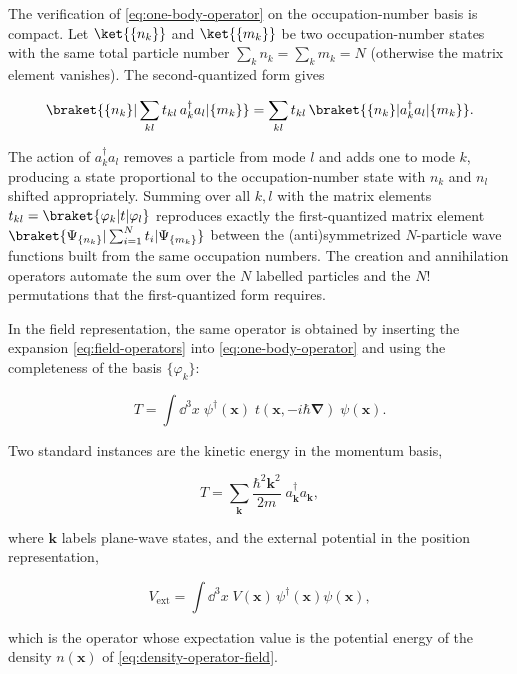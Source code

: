 \begin{note}
    The verification of \eqref{eq:one-body-operator} on the occupation-number basis is compact. Let $\ket{\{n_k\}}$ and $\ket{\{m_k\}}$ be two occupation-number states with the same total particle number $\sum_k n_k = \sum_k m_k = N$ (otherwise the matrix element vanishes). The second-quantized form gives
    \begin{linenomath}
        \begin{equation*}
            \braket{\{n_k\}|\sum_{kl} t_{kl}\,a_k^\dagger a_l|\{m_k\}}
            = \sum_{kl} t_{kl}\,\braket{\{n_k\}|a_k^\dagger a_l|\{m_k\}}.
        \end{equation*}
    \end{linenomath}
    The action of $a_k^\dagger a_l$ removes a particle from mode $l$ and adds one to mode $k$, producing a state proportional to the occupation-number state with $n_k$ and $n_l$ shifted appropriately. Summing over all $k,l$ with the matrix elements $t_{kl} = \braket{\varphi_k|t|\varphi_l}$ reproduces exactly the first-quantized matrix element $\braket{\Psi_{\{n_k\}}|\sum_{i=1}^N t_i|\Psi_{\{m_k\}}}$ between the (anti)symmetrized $N$-particle wave functions built from the same occupation numbers. The creation and annihilation operators automate the sum over the $N$ labelled particles and the $N!$ permutations that the first-quantized form requires.
\end{note}

In the field representation, the same operator is obtained by inserting the expansion \eqref{eq:field-operators} into \eqref{eq:one-body-operator} and using the completeness of the basis $\{\varphi_k\}$:
\begin{linenomath}
    \begin{equation}
        T = \int\!\dd^3 x\;\psi^\dagger(\bm x)\;t(\bm x, -i\hbar\bm\nabla)\;\psi(\bm x).
    \end{equation}
\end{linenomath}
Two standard instances are the kinetic energy in the momentum basis,
\begin{linenomath}
    \begin{equation*}
        T = \sum_{\bm k} \frac{\hbar^2 \bm k^2}{2m}\;a_{\bm k}^\dagger a_{\bm k},
    \end{equation*}
\end{linenomath}
where $\bm k$ labels plane-wave states, and the external potential in the position representation,
\begin{linenomath}
    \begin{equation*}
        V_{\text{ext}} = \int\!\dd^3 x\;V(\bm x)\,\psi^\dagger(\bm x)\psi(\bm x),
    \end{equation*}
\end{linenomath}
which is the operator whose expectation value is the potential energy of the density $n(\bm x)$ of \eqref{eq:density-operator-field}.

